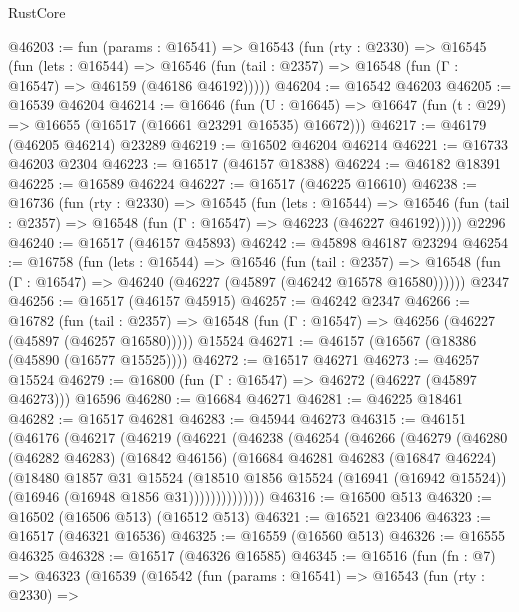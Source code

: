\begin{lexlean}{RustCore}
\begin{coremodule}
@46203 := fun (params : @16541) =>
  @16543
    (fun (rty : @2330) =>
    @16545
      (fun (lets : @16544) =>
      @16546 (fun (tail : @2357) => @16548 (fun (Γ : @16547) => @46159 (@46186 @46192)))))
@46204 := @16542 @46203
@46205 := @16539 @46204
@46214 := @16646
    (fun (U : @16645) => @16647 (fun (t : @29) => @16655 (@16517 (@16661 @23291 @16535) @16672)))
@46217 := @46179 (@46205 @46214) @23289
@46219 := @16502 @46204 @46214
@46221 := @16733 @46203 @2304
@46223 := @16517 (@46157 @18388)
@46224 := @46182 @18391
@46225 := @16589 @46224
@46227 := @16517 (@46225 @16610)
@46238 := @16736
    (fun (rty : @2330) =>
    @16545
      (fun (lets : @16544) =>
      @16546 (fun (tail : @2357) => @16548 (fun (Γ : @16547) => @46223 (@46227 @46192)))))
    @2296
@46240 := @16517 (@46157 @45893)
@46242 := @45898 @46187 @23294
@46254 := @16758
    (fun (lets : @16544) =>
    @16546
      (fun (tail : @2357) =>
      @16548 (fun (Γ : @16547) => @46240 (@46227 (@45897 (@46242 @16578 @16580))))))
    @2347
@46256 := @16517 (@46157 @45915)
@46257 := @46242 @2347
@46266 := @16782
    (fun (tail : @2357) => @16548 (fun (Γ : @16547) => @46256 (@46227 (@45897 (@46257 @16580)))))
    @15524
@46271 := @46157 (@16567 (@18386 (@45890 (@16577 @15525))))
@46272 := @16517 @46271
@46273 := @46257 @15524
@46279 := @16800 (fun (Γ : @16547) => @46272 (@46227 (@45897 @46273))) @16596
@46280 := @16684 @46271
@46281 := @46225 @18461
@46282 := @16517 @46281
@46283 := @45944 @46273
@46315 := @46151
    (@46176
      (@46217
        (@46219
          (@46221
            (@46238
              (@46254
                (@46266
                  (@46279
                    (@46280
                      (@46282 @46283)
                      (@16842 @46156)
                      (@16684
                        @46281
                        @46283
                        (@16847 @46224)
                        (@18480
                          @1857
                          @31
                          @15524
                          (@18510
                            @1856
                            @15524
                            (@16941 (@16942 @15524))
                            (@16946 (@16948 @1856 @31))))))))))))))
@46316 := @16500 @513
@46320 := @16502 (@16506 @513) (@16512 @513)
@46321 := @16521 @23406
@46323 := @16517 (@46321 @16536)
@46325 := @16559 (@16560 @513)
@46326 := @16555 @46325
@46328 := @16517 (@46326 @16585)
@46345 := @16516
    (fun (fn : @7) =>
    @46323
      (@16539
        (@16542
          (fun (params : @16541) =>
          @16543
            (fun (rty : @2330) =>

\end{coremodule}
\end{lexlean}
